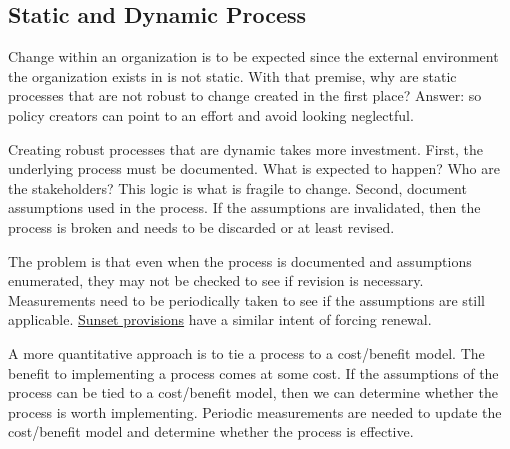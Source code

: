 \subsection{Static and Dynamic Process\label{sec:static-dynamic_processes}}


Change within an organization is to be expected since the external environment the organization exists in is not static. With that premise, why are static processes that are not robust to change created in the first place? Answer: so policy creators can point to an effort and avoid looking neglectful.

Creating robust processes that are dynamic takes more investment. First, the underlying process must be documented. What is expected to happen? Who are the stakeholders? This logic is what is fragile to change. Second, document assumptions used in the process. If the assumptions are invalidated, then the process is broken and needs to be discarded or at least revised. 

The problem is that even when the process is documented and assumptions enumerated, they may not be checked to see if revision is necessary. Measurements need to be periodically taken to see if the assumptions are still applicable. \href{https://en.wikipedia.org/wiki/Sunset_provision}{Sunset provisions} have a similar intent of forcing renewal. 

A more quantitative approach is to tie a process to a cost/benefit model. The benefit to implementing a process comes at some cost. If the assumptions of the process can be tied to a cost/benefit model, then we can determine whether the process is worth implementing. Periodic measurements are needed to update the cost/benefit model and determine whether the process is effective.
